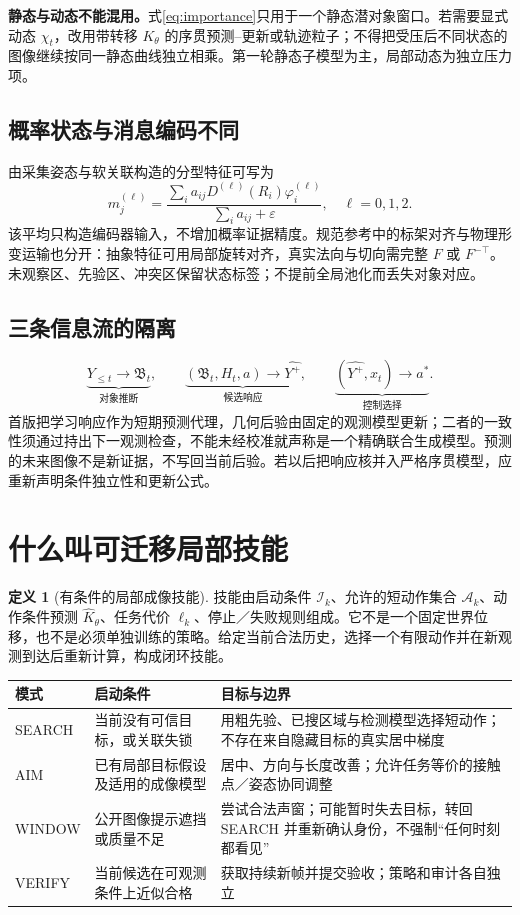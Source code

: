 \documentclass[UTF8,fontset=fandol,11pt,a4paper]{ctexart}
\theoremstyle{plain}
\theoremstyle{definition}
\newtheorem{definition}[theorem]{定义}
\theoremstyle{remark}
\numberwithin{equation}{section}
\newcommand{\B}{\mathfrak B}
\newcommand{\cA}{\mathcal A}
\begin{document}
\textbf{静态与动态不能混用。}式\eqref{eq:importance}只用于一个静态潜对象窗口。若需要显式动态 $\chi_t$，改用带转移 $K_\theta$ 的序贯预测--更新或轨迹粒子；不得把受压后不同状态的图像继续按同一静态曲线独立相乘。第一轮静态子模型为主，局部动态为独立压力项。

\subsection{概率状态与消息编码不同}
由采集姿态与软关联构造的分型特征可写为
\begin{equation}
m_j^{(\ell)}=\frac{\sum_i a_{ij}D^{(\ell)}(R_i)\varphi_i^{(\ell)}}{\sum_i a_{ij}+\varepsilon},\quad \ell=0,1,2.
\label{eq:lift}
\end{equation}
该平均只构造编码器输入，不增加概率证据精度。规范参考中的标架对齐与物理形变运输也分开：抽象特征可用局部旋转对齐，真实法向与切向需完整 $F$ 或 $F^{-\top}$。未观察区、先验区、冲突区保留状态标签；不提前全局池化而丢失对象对应。

\subsection{三条信息流的隔离}
\begin{equation}
\underbrace{Y_{\le t}\longrightarrow\B_t}_{\text{对象推断}},\qquad
\underbrace{(\B_t,H_t,a)\longrightarrow\widehat{Y^+}}_{\text{候选响应}},\qquad
\underbrace{(\widehat{Y^+},x_t)\longrightarrow a^*}_{\text{控制选择}}.
\label{eq:flows}
\end{equation}
首版把学习响应作为短期预测代理，几何后验由固定的观测模型更新；二者的一致性须通过持出下一观测检查，不能未经校准就声称是一个精确联合生成模型。预测的未来图像不是新证据，不写回当前后验。若以后把响应核并入严格序贯模型，应重新声明条件独立性和更新公式。

\section{什么叫可迁移局部技能}
\label{sec:skill}
\begin{definition}[有条件的局部成像技能]
技能由启动条件 $\mathcal I_k$、允许的短动作集合 $\cA_k$、动作条件预测 $\widehat K_\theta$、任务代价 $\ell_k$、停止／失败规则组成。它不是一个固定世界位移，也不是必须单独训练的策略。给定当前合法历史，选择一个有限动作并在新观测到达后重新计算，构成闭环技能。
\end{definition}

\begin{longtable}{P{23mm}P{48mm}P{75mm}}
\toprule 模式 & 启动条件 & 目标与边界\\\midrule\endhead
SEARCH & 当前没有可信目标，或关联失锁 & 用粗先验、已搜区域与检测模型选择短动作；不存在来自隐藏目标的真实居中梯度\\
AIM & 已有局部目标假设及适用的成像模型 & 居中、方向与长度改善；允许任务等价的接触点／姿态协同调整\\
WINDOW & 公开图像提示遮挡或质量不足 & 尝试合法声窗；可能暂时失去目标，转回 SEARCH 并重新确认身份，不强制“任何时刻都看见”\\
VERIFY & 当前候选在可观测条件上近似合格 & 获取持续新帧并提交验收；策略和审计各自独立\\\bottomrule
\end{longtable}
\end{document}
